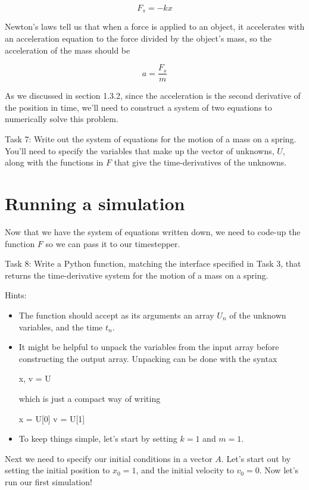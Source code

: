 \documentclass[main.tex]{subfiles}
\begin{document}
\begin{equation}
    F_s = - k x
\end{equation}

Newton's laws tell us that when a force is applied to an object, it accelerates with an acceleration equation to the force divided by the object's mass, so the acceleration of the mass should be

\begin{equation}
    a = \frac{F_s}{m}
\end{equation}

As we discussed in section 1.3.2, since the acceleration is the second derivative of the position in time, we'll need to construct a system of two equations to numerically solve this problem.

Task 7: Write out the system of equations for the motion of a mass on a spring.
You'll need to specify the variables that make up the vector of unknowns, $U$, along with the functions in $F$ that give the time-derivatives of the unknowns.

\section{Running a simulation}

Now that we have the system of equations written down, we need to code-up the function $F$ so we can pass it to our timestepper.

Task 8: Write a Python function, matching the interface specified in Task 3, that returns the time-derivative system for the motion of a mass on a spring.

Hints:
\begin{itemize}
\item The function should accept as its arguments an array $U_n$ of the unknown variables, and the time $t_n$.
\item It might be helpful to unpack the variables from the input array before constructing the output array.
Unpacking can be done with the syntax
\begin{python}
 x, v = U
\end{python}
which is just a compact way of writing
\begin{python}
 x = U[0]
 v = U[1]
\end{python}
\item To keep things simple, let's start by setting $k=1$ and $m=1$.
\end{itemize}

Next we need to specify our initial conditions in a vector $A$.
Let's start out by setting the initial position to $x_0=1$, and the initial velocity to $v_0=0$.
Now let's run our first simulation!
\end{document}
